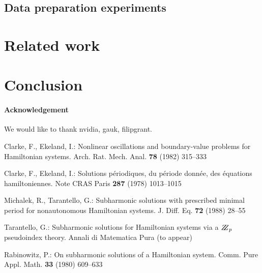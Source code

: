 \documentclass{itatnew}
\begin{document}
\subsection{Data preparation experiments}

\section{Related work}

\section{Conclusion}




\paragraph{Acknowledgement}
We would like to thank nvidia, gauk, filipgrant.




%
%
\begin{thebibliography}{5}
%
Clarke, F., Ekeland, I.:
Nonlinear oscillations and
boundary-value problems for Hamiltonian systems.
Arch. Rat. Mech. Anal. {\bf 78} (1982) 315--333

Clarke, F., Ekeland, I.:
Solutions p\'{e}riodiques, du
p\'{e}riode donn\'{e}e, des \'{e}quations hamiltoniennes.
Note CRAS Paris {\bf 287} (1978) 1013--1015

Michalek, R., Tarantello, G.:
Subharmonic solutions with prescribed minimal
period for nonautonomous Hamiltonian systems.
J. Diff. Eq. {\bf 72} (1988) 28--55

Tarantello, G.:
Subharmonic solutions for Hamiltonian
systems via a $\bbbz_{p}$ pseudoindex theory.
Annali di Matematica Pura (to appear)

Rabinowitz, P.:
On subharmonic solutions of a Hamiltonian system.
Comm. Pure Appl. Math. {\bf 33} (1980) 609--633


\end{thebibliography}
\end{document}
